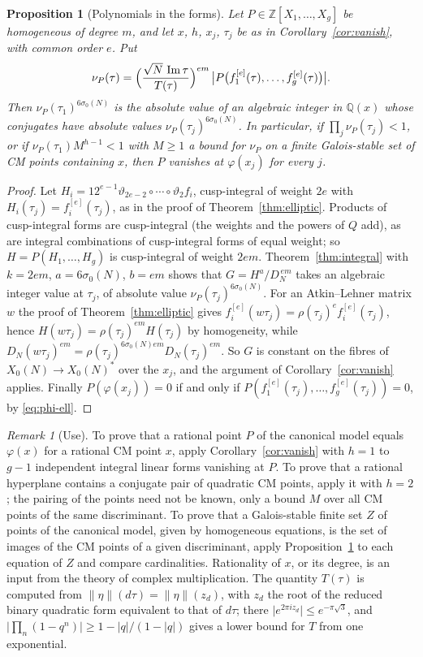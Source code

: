 \documentclass[11pt]{amsart}
\newtheorem{proposition}[theorem]{Proposition}
\theoremstyle{definition}
\theoremstyle{remark}
\newtheorem{remark}[theorem]{Remark}
\newcommand{\Z}{\mathbb{Z}}
\newcommand{\Q}{\mathbb{Q}}
\newcommand{\im}{\operatorname{Im}}
\newcommand{\sz}{\sigma_0}
\newcommand{\Xs}{X_0(N)^*}
\newcommand{\etanorm}[1]{\lVert\eta\rVert(#1)}
\begin{document}
\begin{proposition}[Polynomials in the forms]\label{prop:poly}
Let $P\in\Z[X_1,\dots,X_g]$ be homogeneous of degree $m$, and let $x$, $h$,
$x_j$, $\tau_j$ be as in Corollary~\ref{cor:vanish}, with common order $e$.  Put
\[
\nu_P(\tau)=\Bigl(\frac{\sqrt N\,\im\tau}{T(\tau)}\Bigr)^{em}\,
\bigl\lvert P\bigl(f_1^{[e]}(\tau),\dots,f_g^{[e]}(\tau)\bigr)\bigr\rvert .
\]
Then $\nu_P(\tau_1)^{6\sz(N)}$ is the absolute value of an algebraic integer in
$\Q(x)$ whose conjugates have absolute values $\nu_P(\tau_j)^{6\sz(N)}$.  In
particular, if $\prod_{j}\nu_P(\tau_j)<1$, or if $\nu_P(\tau_1)M^{h-1}<1$ with
$M\ge1$ a bound for $\nu_P$ on a finite Galois-stable set of CM points
containing $x$, then $P$ vanishes at $\varphi(x_j)$ for every $j$.
\end{proposition}
\begin{proof}
Let $H_i=12^{e-1}\vartheta_{2e-2}\circ\cdots\circ\vartheta_2f_i$, cusp-integral of
weight $2e$ with $H_i(\tau_j)=f_i^{[e]}(\tau_j)$, as in the proof of
Theorem~\ref{thm:elliptic}.  Products of cusp-integral forms are cusp-integral
(the weights and the powers of $Q$ add), as are integral combinations of
cusp-integral forms of equal weight; so $H=P(H_1,\dots,H_g)$ is cusp-integral of
weight $2em$.  Theorem~\ref{thm:integral} with $k=2em$, $a=6\sz(N)$, $b=em$
shows that $G=H^a/D_N^{\,em}$ takes an algebraic integer value at $\tau_j$, of
absolute value $\nu_P(\tau_j)^{6\sz(N)}$.  For an Atkin--Lehner matrix $w$ the
proof of Theorem~\ref{thm:elliptic} gives
$f_i^{[e]}(w\tau_j)=\rho(\tau_j)^ef_i^{[e]}(\tau_j)$, hence
$H(w\tau_j)=\rho(\tau_j)^{em}H(\tau_j)$ by homogeneity, while
$D_N(w\tau_j)^{em}=\rho(\tau_j)^{6\sz(N)em}D_N(\tau_j)^{em}$.  So $G$ is constant
on the fibres of $X_0(N)\to\Xs$ over the $x_j$, and the argument of
Corollary~\ref{cor:vanish} applies.  Finally $P(\varphi(x_j))=0$ if and only if
$P(f_1^{[e]}(\tau_j),\dots,f_g^{[e]}(\tau_j))=0$, by \eqref{eq:phi-ell}.
\end{proof}

\begin{remark}[Use]\label{rem:use}
To prove that a rational point $P$ of the canonical model equals $\varphi(x)$
for a rational CM point $x$, apply Corollary~\ref{cor:vanish} with $h=1$ to
$g-1$ independent integral linear forms vanishing at $P$.  To prove that a
rational hyperplane contains a conjugate pair of quadratic CM points, apply it
with $h=2$; the pairing of the points need not be known, only a bound $M$ over
all CM points of the same discriminant.  To prove that a Galois-stable finite
set $Z$ of points of the canonical model, given by homogeneous equations, is the
set of images of the CM points of a given discriminant, apply
Proposition~\ref{prop:poly} to each equation of $Z$ and compare cardinalities.
Rationality of $x$, or its degree,
is an input from the theory of complex multiplication.  The quantity $T(\tau)$ is
computed from $\etanorm{d\tau}=\etanorm{z_d}$, with $z_d$ the root of the reduced
binary quadratic form equivalent to that of $d\tau$; there
$\lvert e^{2\pi iz_d}\rvert\le e^{-\pi\sqrt3}$, and
$\lvert\prod_n(1-q^n)\rvert\ge1-\lvert q\rvert/(1-\lvert q\rvert)$ gives a lower
bound for $T$ from one exponential.
\end{remark}
\end{document}

